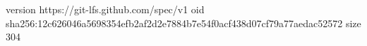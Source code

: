 version https://git-lfs.github.com/spec/v1
oid sha256:12c626046a5698354efb2af2d2e7884b7e54f0acf438d07cf79a77aedac52572
size 304
